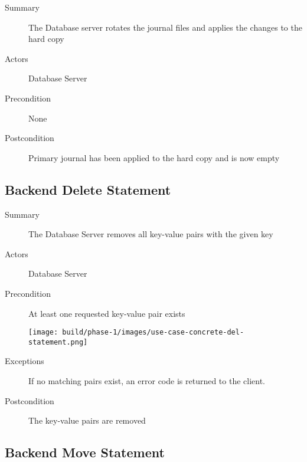 \documentclass[a4paper]{report}
\begin{document}
	\begin{description}
		\item[Summary] The Database server rotates the journal files and applies the changes to the hard copy
		\item[Actors] Database Server
		\item[Precondition] None

		\begin{center}
		\end{center}

		\item[Postcondition] Primary journal has been applied to the hard copy and is now empty
	\end{description}

	\pagebreak
	
	\subsection{Backend Delete Statement}

	\begin{description}
		\item[Summary] The Database Server removes all key-value pairs with the given key
		\item[Actors] Database Server
		\item[Precondition] At least one requested key-value pair exists

		\begin{center}
			\texttt{[image: build/phase-1/images/use-case-concrete-del-statement.png]}
		\end{center}

		\item[Exceptions] If no matching pairs exist, an error code is returned to the client.
		\item[Postcondition] The key-value pairs are removed
	\end{description}
	
	\pagebreak

	\subsection{Backend Move Statement}
\end{document}
